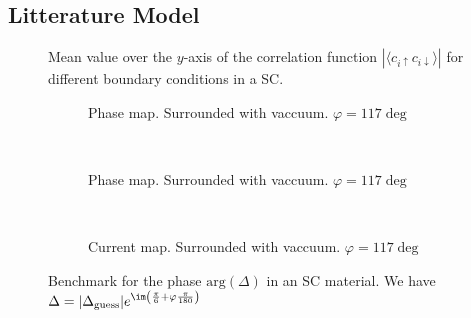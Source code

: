 \documentclass[../main.tex]{subfiles}
\begin{document}
\subsection{Litterature Model}
\begin{figure}[H]
    \centering
    
    \caption{Mean value over the $y$-axis of the correlation function $|\langle c_{i\uparrow} c_{i\downarrow}\rangle|$ for different boundary conditions in a SC.}
\end{figure}
\begin{figure}[H]
    \begin{subfigure}{0.4\textwidth}
        \centering
        \hspace{-4cm} %
        
        \caption{Phase map. Surrounded with vaccuum. $\varphi = 117\deg$}
        \label{fig:first}
    \end{subfigure}    \\
    \begin{subfigure}{0.4\textwidth}
        \centering
        \hspace{-4cm} %
        
        \caption{Phase map. Surrounded with vaccuum. $\varphi = 117\deg$}
        \label{fig:first}
    \end{subfigure}    \\

    \hspace{0.1\textwidth}
    \begin{subfigure}{0.4\textwidth}
        \centering
        
        \caption{Current map. Surrounded with vaccuum. $\varphi = 117 \deg$}
        \label{fig:first}
    \end{subfigure}

    \caption{Benchmark for the phase $\text{arg}(\Delta)$ in an SC material. We have $\Delta = |\Delta_{\text{guess}}|e^{\im \left(\frac{\pi}{6} + \varphi\frac{\pi}{180}\right)}$}
\end{figure}    
\end{document}
